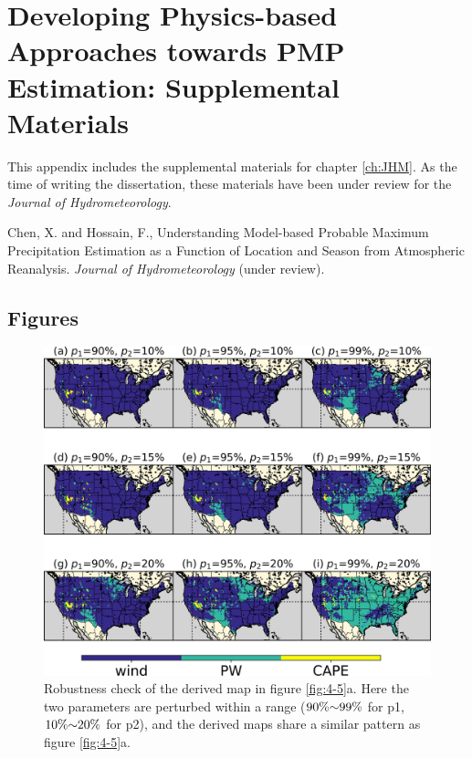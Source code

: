 \chapter{Developing Physics-based Approaches towards PMP Estimation: Supplemental Materials}

This appendix includes the supplemental materials for chapter \ref{ch:JHM}. As the time of writing the dissertation, these materials have been under review for the \textit{Journal of Hydrometeorology}.

\bigbreak

\noindent
{}
\setlength{\hangindent}{2em}
Chen, X. and Hossain, F., Understanding Model-based Probable Maximum Precipitation Estimation as a Function of Location and Season from Atmospheric Reanalysis. \textit{Journal of Hydrometeorology} (under review).

\vspace{10mm}

\noindent

\section{Figures}

\begin{figure}[htbp]
	\includegraphics[width=16cm]{pics/ch4/figS1.png}
	\caption{Robustness check of the derived map in figure \ref{fig:4-5}a. Here the two parameters are perturbed within a range ($90\%\scriptsize{\sim}99\%$ for p1, $10\%\scriptsize{\sim}20\%$ for p2), and the derived maps share a similar pattern as figure \ref{fig:4-5}a.}
	\label{fig:4-S1}
\end{figure}

